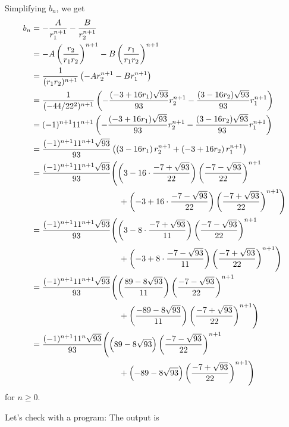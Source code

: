 Simplifying $b_n$, we get
\begin{align*}
b_n
&= -\frac{A}{r_1^{n+1}} - \frac{B}{r_2^{n+1}}
\\
&= -A\left(\frac{r_2}{r_1r_2}\right)^{n+1} - B\left(\frac{r_1}{r_1r_2} \right)^{n+1}
\\
&=
\frac{1}{(r_1r_2)^{n+1}}
\left(
-A r_2^{n+1}
-B r_1^{n+1}
\right)
\\
&=
\frac{1}{(-44/22^2)^{n+1}}
\left(
-\frac{(-3 + 16r_1)\sqrt{93}}{93} r_2^{n+1} 
-\frac{(3 - 16r_2)\sqrt{93}}{93} r_1^{n+1}
\right)
\\
&=
(-1)^{n+1}
11^{n+1}
\left(
-\frac{(-3 + 16r_1)\sqrt{93}}{93} r_2^{n+1} 
-\frac{(3 - 16r_2)\sqrt{93}}{93} r_1^{n+1}
\right)
\\
&=
\frac{(-1)^{n+1}11^{n+1}\sqrt{93}}{93}
\left(
        \left( 3 - 16 r_1 \right) r_2^{n+1}
        +
        \left( -3 + 16 r_2 \right) r_1^{n+1}
\right)
\\
&=
\frac{(-1)^{n+1}11^{n+1}\sqrt{93}}{93}
\Biggl(
        \left( 3 - 16 \cdot \frac{-7 + \sqrt{93}}{22} \right)
        \left( \frac{-7 - \sqrt{93}}{22} \right)^{n+1}
        \\
&\hspace{3.7cm}        
        +
        \left( -3 + 16 \cdot \frac{-7 - \sqrt{93}}{22} \right)
        \left( \frac{-7 + \sqrt{93}}{22} \right)^{n+1}
\Biggr)
\\
&=
\frac{(-1)^{n+1}11^{n+1}\sqrt{93}}{93}
\Biggl(
        \left( 3 - 8 \cdot \frac{-7 + \sqrt{93}}{11} \right)
        \left( \frac{-7 - \sqrt{93}}{22} \right)^{n+1}
        \\
&\hspace{3.7cm}        
        +
        \left( -3 + 8 \cdot \frac{-7 - \sqrt{93}}{11} \right)
        \left( \frac{-7 + \sqrt{93}}{22} \right)^{n+1}
\Biggr)
\\
&=
\frac{(-1)^{n+1}11^{n+1}\sqrt{93}}{93}
\Biggl(
        \left( \frac{89 - 8\sqrt{93}}{11} \right)
        \left( \frac{-7 - \sqrt{93}}{22} \right)^{n+1}
        \\
&\hspace{3.7cm}        
        +
        \left( \frac{-89 - 8\sqrt{93}}{11} \right)
        \left( \frac{-7 + \sqrt{93}}{22} \right)^{n+1}
\Biggr)
\\
&=
\frac{(-1)^{n+1}11^{n}\sqrt{93}}{93}
\Biggl(
        \left( 89 - 8\sqrt{93} \right)
        \left( \frac{-7 - \sqrt{93}}{22} \right)^{n+1}
        \\
&\hspace{3.7cm}        
        +
        \left( -89 - 8\sqrt{93} \right)
        \left( \frac{-7 + \sqrt{93}}{22} \right)^{n+1}
\Biggr)
\\
\end{align*}
for $n \geq 0$.

Let's check with a program:
The output is
